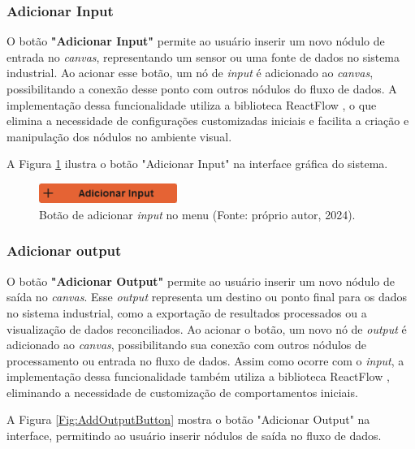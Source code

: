\subsubsection{Adicionar Input}

O botão \textbf{"Adicionar Input"} permite ao usuário inserir um novo nódulo de entrada no \textit{canvas}, representando um sensor ou uma fonte de dados no sistema industrial. Ao acionar esse botão, um nó de \textit{input} é adicionado ao \textit{canvas}, possibilitando a conexão desse ponto com outros nódulos do fluxo de dados. A implementação dessa funcionalidade utiliza a biblioteca ReactFlow \cite{reactflow}, o que elimina a necessidade de configurações customizadas iniciais e facilita a criação e manipulação dos nódulos no ambiente visual.

A Figura \ref{Fig:AddInputButton} ilustra o botão "Adicionar Input" na interface gráfica do sistema.

\begin{figure}[htbp]
    \centering
    \includegraphics[width=0.4\textwidth]{figuras/add-input-button.png}
    \caption{Botão de adicionar \textit{input} no menu (Fonte: próprio autor, 2024).}
    \label{Fig:AddInputButton}
\end{figure}

\subsubsection{Adicionar output}

O botão \textbf{"Adicionar Output"} permite ao usuário inserir um novo nódulo de saída no \textit{canvas}. Esse \textit{output} representa um destino ou ponto final para os dados no sistema industrial, como a exportação de resultados processados ou a visualização de dados reconciliados. Ao acionar o botão, um novo nó de \textit{output} é adicionado ao \textit{canvas}, possibilitando sua conexão com outros nódulos de processamento ou entrada no fluxo de dados. Assim como ocorre com o \textit{input}, a implementação dessa funcionalidade também utiliza a biblioteca ReactFlow \cite{reactflow}, eliminando a necessidade de customização de comportamentos iniciais.

A Figura \ref{Fig:AddOutputButton} mostra o botão "Adicionar Output" na interface, permitindo ao usuário inserir nódulos de saída no fluxo de dados.

